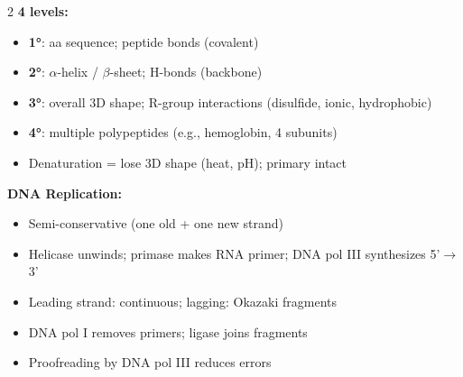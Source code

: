 \documentclass[11pt, letterpaper]{article}
\begin{document}
\begin{tcolorbox}[colback=partbg, colframe=sectionblue,
  title={\bfseries Protein Structure \& DNA Replication}, arc=3pt, boxrule=1pt]
\footnotesize
\begin{multicols}{2}
\textbf{4 levels:}
\begin{itemize}[noitemsep, leftmargin=*]
  \item \textbf{1°}: aa sequence; peptide bonds (covalent)
  \item \textbf{2°}: $\alpha$-helix / $\beta$-sheet; H-bonds (backbone)
  \item \textbf{3°}: overall 3D shape; R-group interactions (disulfide, ionic, hydrophobic)
  \item \textbf{4°}: multiple polypeptides (e.g., hemoglobin, 4 subunits)
  \item Denaturation = lose 3D shape (heat, pH); primary intact
\end{itemize}
\columnbreak
\textbf{DNA Replication:}
\begin{itemize}[noitemsep, leftmargin=*]
  \item Semi-conservative (one old + one new strand)
  \item Helicase unwinds; primase makes RNA primer; DNA pol III synthesizes 5'$\to$3'
  \item Leading strand: continuous; lagging: Okazaki fragments
  \item DNA pol I removes primers; ligase joins fragments
  \item Proofreading by DNA pol III reduces errors
\end{itemize}
\end{multicols}
\end{tcolorbox}

\vspace{4pt}
\end{document}
